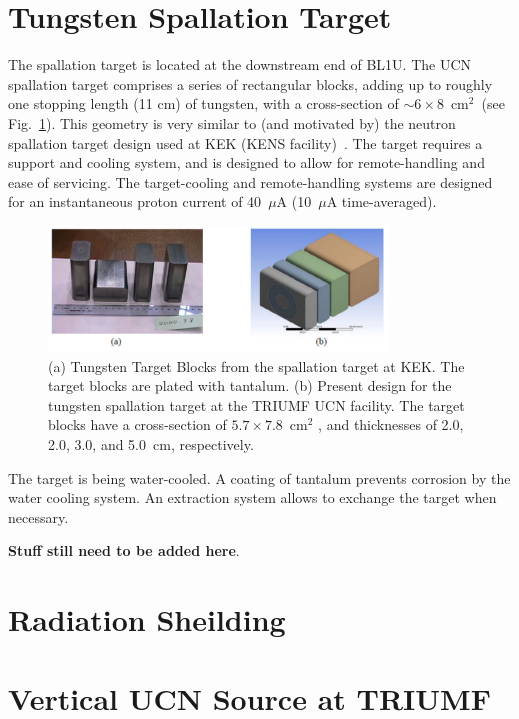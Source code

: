 \section{Tungsten Spallation Target}
The spallation target is located at the downstream end of BL1U. The
UCN spallation target comprises a series of rectangular blocks, adding
up to roughly one stopping length (11 cm) of tungsten, with a
cross-section of $\sim6 \times 8$~cm$^2$~(see
Fig.~\ref{fig:target}). This geometry is very similar to (and
motivated by) the neutron spallation target design used at KEK (KENS
facility)~\cite{kawai2001fabrication}. The target requires a support
and cooling system, and is designed to allow for remote-handling and
ease of servicing. The target-cooling and remote-handling systems are
designed for an instantaneous proton current of 40~$\mu$A (10~$\mu$A
time-averaged).
\begin{figure}[h!]
  \centering
  \includegraphics[width=0.8\textwidth]{target.png}
  \caption{(a) Tungsten Target Blocks from the spallation target at
    KEK. The target blocks are plated with tantalum. (b) Present
    design for the tungsten spallation target at the TRIUMF UCN
    facility. The target blocks have a cross-section of
    $5.7 \times 7.8$~cm$^2$ , and thicknesses of 2.0, 2.0, 3.0, and
    5.0~cm, respectively.}
  \label{fig:target}
\end{figure}
The target is being water-cooled. A coating of tantalum prevents
corrosion by the water cooling system. An extraction system allows to
exchange the target when necessary.

\textbf{Stuff still need to be added here}.

\section{Radiation Sheilding}

\section{Vertical UCN Source at TRIUMF\label{sec:vertical_source}}


